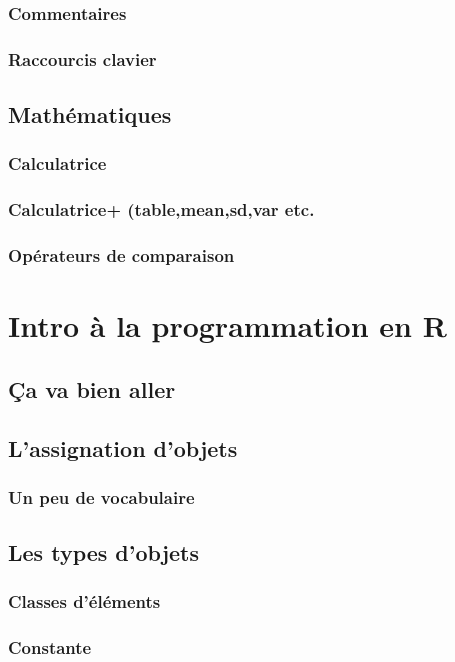 \documentclass[10.5pt,a4paper]{article}
\begin{document}
    \subsubsection{Commentaires}
    \subsubsection{Raccourcis clavier}
  \subsection{Mathématiques}
    \subsubsection{Calculatrice}
    \subsubsection{Calculatrice+ (table,mean,sd,var etc.}
    \subsubsection{Opérateurs de comparaison}


\section{Intro à la programmation en R}
  \subsection{Ça va bien aller}
  \subsection{L'assignation d'objets}
    \subsubsection{Un peu de vocabulaire}
  \subsection{Les types d'objets}
    \subsubsection{Classes d'éléments}
    \subsubsection{Constante}
\end{document}
